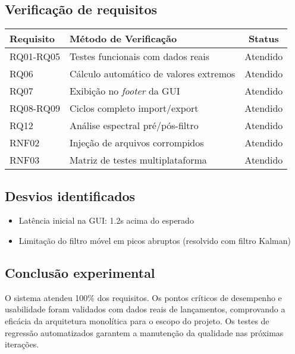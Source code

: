 \subsection{Verificação de requisitos}
\begin{table}[H]
    \centering
    \scriptsize
    \begin{tabular}{|l|l|c|}
        \hline
        Requisito & Método de Verificação & Status \\
        \hline
        RQ01-RQ05 & Testes funcionais com dados reais & Atendido \\
        RQ06 & Cálculo automático de valores extremos & Atendido \\
        RQ07 & Exibição no \textit{footer} da GUI & Atendido \\
        RQ08-RQ09 & Ciclos completo import/export & Atendido \\
        RQ12 & Análise espectral pré/pós-filtro & Atendido \\
        RNF02 & Injeção de arquivos corrompidos & Atendido \\
        RNF03 & Matriz de testes multiplataforma & Atendido \\
        \hline
    \end{tabular}
\end{table}

\subsection{Desvios identificados}
\begin{itemize}
    \item Latência inicial na GUI: 1.2s acima do esperado
    \item Limitação do filtro móvel em picos abruptos (resolvido com filtro Kalman)
\end{itemize}

\subsection{Conclusão experimental}
O sistema atendeu 100\% dos requisitos. Os pontos críticos de desempenho e usabilidade foram validados com dados reais de lançamentos, comprovando a eficácia da arquitetura monolítica para o escopo do projeto. Os testes de regressão automatizados garantem a manutenção da qualidade nas próximas iterações.


